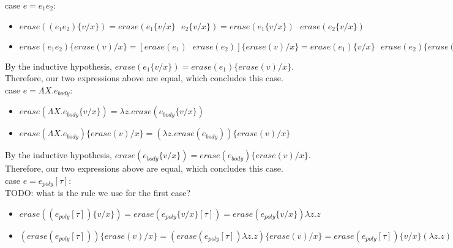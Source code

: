 \documentclass[10pt]{article}
\begin{document}
\begin{exercise}
{\sc case} $e = e_1e_2$:
\begin{itemize}
\item $\mathit{erase}((e_1e_2)\{v/x\}) = \mathit{erase}(e_1\{v/x\} \text{ } e_2\{v/x\}) =  \mathit{erase}(e_1\{v/x\})\text{ } \mathit{erase}(e_2\{v/x\})$
\item $\mathit{erase}(e_1e_2)\{\mathit{erase}(v)/x\} =  [\mathit{erase}(e_1)\text{ } \mathit{erase}(e_2)] \{\mathit{erase}(v)/x\} = \mathit{erase}(e_1)\{v/x\} \text{ } \mathit{erase}(e_2)\{\mathit{erase}(v)/x\}$\\
\end{itemize}

By the inductive hypothesis, $\mathit{erase}(e_1\{v/x\}) = \mathit{erase}(e_1)\{\mathit{erase}(v)/x\}$. Therefore, our two expressions above are equal, which concludes this case. \checkmark\\

{\sc case} $e = \Lambda X.e_{body}$: 
\begin{itemize}
\item $\mathit{erase}(\Lambda X.e_{body}\{v/x\}) = \lambda z. \mathit{erase}(e_{body}\{v/x\}) $
\item $\mathit{erase}(\Lambda X.e_{body})\{\mathit{erase}(v)/x\} = (\lambda z. \mathit{erase}(e_{body}))\{\mathit{erase}(v)/x\}$ 

\end{itemize}

By the inductive hypothesis, $\mathit{erase}(e_{body}\{v/x\}) = \mathit{erase}(e_{body})\{\mathit{erase}(v)/x\}$. Therefore, our two expressions above are equal, which concludes this case. \checkmark\\


{\sc case} $e = e_{poly}[\tau] $:\\

TODO: what is the rule we use for the first case?\\

\begin{itemize}
\item $\mathit{erase}((e_{poly}[\tau])\{v/x\}) = \mathit{erase}(e_{poly}\{v/x\}[\tau]) = \mathit{erase}(e_{poly} \{v/x\}) \lambda z.z$
\item $(\mathit{erase}(e_{poly}[\tau]))\{\mathit{erase}(v)/x\} = (\mathit{erase}(e_{poly}[\tau]) \lambda z.z)\{\mathit{erase}(v)/x\} = \mathit{erase}(e_{poly}[\tau])\{v/x\} (\lambda z.z)$\\
\end{itemize}


\end{exercise}
\end{document}
